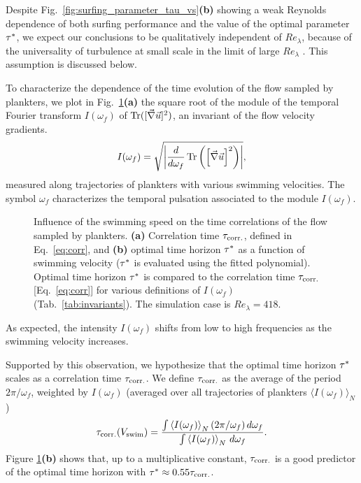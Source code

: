 Despite Fig.~\ref{fig:surfing_parameter_tau_vs}\textbf{(b)} showing a weak Reynolds dependence of both surfing performance and the value of the optimal parameter $\TimeHorizonOpt$, we expect our conclusions to be qualitatively independent of $\mathit{Re}_{\lambda}$, because of the universality of turbulence at small scale in the limit of large $\mathit{Re}_{\lambda}$ \citep{frisch1995turbulence}.
This assumption is discussed below.

To characterize the dependence of the time evolution of the flow sampled by plankters, we plot in Fig.~\ref{fig:surfing_correlation_time}\textbf{(a)} the square root of the module of the temporal Fourier transform $I(\omega_f)$ of $\tr([ \Gradients ]^2)$, an invariant of the flow velocity gradients.
\begin{equation}
	I(\omega_f) = \sqrt{ \abs*{ \frac{d}{d\omega_f} \tr \left( \left[ \Gradients \right]^2 \right)} },
\end{equation}
measured along trajectories of plankters with various swimming velocities. 
The symbol $\omega_f$ characterizes the temporal pulsation associated to the module $I(\omega_f)$.
\begin{figure}%
	\centering
	
	\caption[Influence of the swimming speed on the time correlations of the flow sampled by plankters.]{
		Influence of the swimming speed on the time correlations of the flow sampled by plankters.
		\textbf{(a)} Correlation time $\CorrelationTime$, defined in Eq.~\eqref{eq:corr}, and \textbf{(b)} optimal time horizon $\TimeHorizonOpt$ as a function of swimming velocity ($\TimeHorizonOpt$ is evaluated using the fitted polynomial).
		Optimal time horizon $\TimeHorizonOpt$ is compared to the correlation time $\CorrelationTime$ [Eq.~\eqref{eq:corr}] for various definitions of $I(\omega_f)$ (Tab.~\ref{tab:invariants}).
		The simulation case is $\mathit{Re}_{\lambda} = 418$.
	}
	\label{fig:surfing_correlation_time}
\end{figure}
As expected, the intensity $I(\omega_f)$ shifts from low to high frequencies as the swimming velocity increases.

Supported by this observation, we hypothesize that the optimal time horizon $\TimeHorizonOpt$ scales as a correlation time $\CorrelationTime$.
We define $\CorrelationTime$ as the average of the period $2\pi/\omega_f$, weighted by $I(\omega_f)$ (averaged over all trajectories of plankters $\langle I(\omega_f) \rangle_N$)
\begin{equation}
	\label{eq:corr}
	\CorrelationTime (\SwimmingVelocity) = \frac{\int \left\langle I(\omega_f) \right\rangle_N (2\pi/\omega_f) \, d\omega_f}{\int \left\langle I(\omega_f) \right\rangle_N \, d\omega_f}.
\end{equation}
Figure \ref{fig:surfing_correlation_time}\textbf{(b)} shows that, up to a multiplicative constant, $\CorrelationTime$ is a good predictor of the optimal time horizon with $\TimeHorizonOpt \approx 0.55 \CorrelationTime$.

